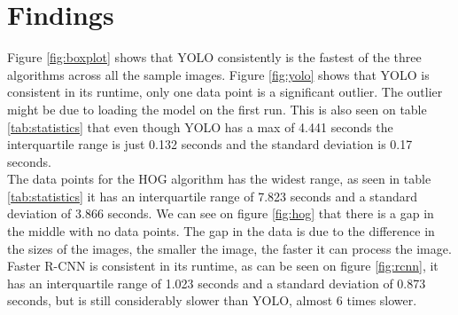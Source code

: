 \section{Findings}
Figure \ref{fig:boxplot} shows that YOLO consistently is the fastest of the three algorithms across all the sample images. Figure \ref{fig:yolo} shows that YOLO is consistent in its runtime, only one data point is a significant outlier. The outlier might be due to loading the model on the first run. This is also seen on table \ref{tab:statistics} that even though YOLO has a max of 4.441 seconds the interquartile range is just 0.132 seconds and the standard deviation is 0.17 seconds.\\
The data points for the HOG algorithm has the widest range, as seen in table \ref{tab:statistics} it has an interquartile range of 7.823 seconds and a standard deviation of 3.866 seconds. We can see on figure \ref{fig:hog} that there is a gap in the middle with no data points. The gap in the data is due to the difference in the sizes of the images, the smaller the image, the faster it can process the image.\\
Faster R-CNN is consistent in its runtime, as can be seen on figure \ref{fig:rcnn}, it has an interquartile range of 1.023 seconds and a standard deviation of 0.873 seconds, but is still considerably slower than YOLO, almost 6 times slower.

